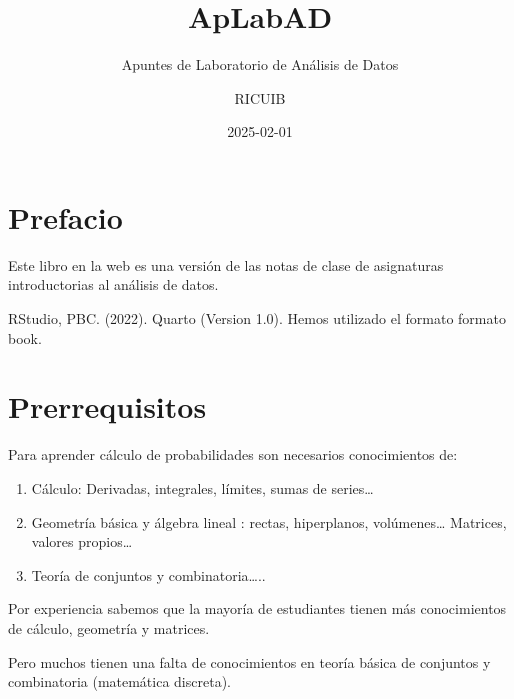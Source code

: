 \documentclass[
  letterpaper,
  DIV=11,
  numbers=noendperiod]{scrreprt}
\title{ApLabAD}
\subtitle{Apuntes de Laboratorio de Análisis de Datos}
\author{RICUIB}
\date{2025-02-01}
\providecommand{\tightlist}{%
  \setlength{\itemsep}{0pt}\setlength{\parskip}{0pt}}\usepackage{longtable,booktabs,array}
\renewcommand*\contentsname{Tabla de contenidos}
\newcommand\contentsname{Tabla de contenidos}
\begin{document}
\maketitle

\renewcommand*\contentsname{Tabla de contenidos}
{
\hypersetup{linkcolor=}
\setcounter{tocdepth}{2}
\tableofcontents
}


\chapter*{Prefacio}\label{prefacio}


Este libro en la web es una versión de las notas de clase de asignaturas
introductorias al análisis de datos.

\begin{description}
\tightlist
\item[Ha sido elaborado con \href{https://quarto.org/}{Quarto}]
RStudio, PBC. (2022). Quarto (Version 1.0). Hemos utilizado el formato
formato book.
\end{description}


\chapter{Prerrequisitos}\label{prerrequisitos}

Para aprender cálculo de probabilidades son necesarios conocimientos de:

\begin{enumerate}
\def\labelenumi{\arabic{enumi}.}
\tightlist
\item
  Cálculo: Derivadas, integrales, límites, sumas de series\ldots{}
\item
  Geometría básica y álgebra lineal : rectas, hiperplanos,
  volúmenes\ldots{} Matrices, valores propios\ldots{}
\item
  Teoría de conjuntos y combinatoria\ldots..
\end{enumerate}

Por experiencia sabemos que la mayoría de estudiantes tienen más
conocimientos de cálculo, geometría y matrices.

Pero muchos tienen una falta de conocimientos en teoría básica de
conjuntos y combinatoria (matemática discreta).
\end{document}

